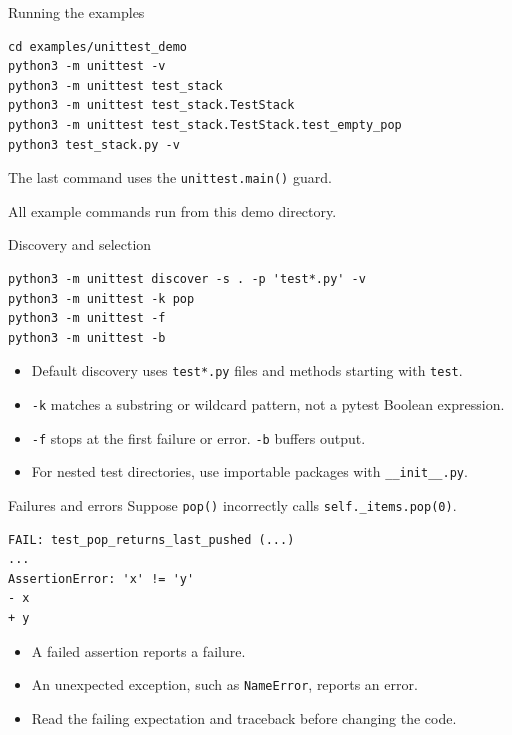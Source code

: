 \documentclass[aspectratio=169,11pt]{beamer}
\newcommand{\code}[1]{\texttt{#1}}
\begin{document}
\begin{frame}[fragile]{Running the examples}
\begin{lstlisting}
cd examples/unittest_demo
python3 -m unittest -v
python3 -m unittest test_stack
python3 -m unittest test_stack.TestStack
python3 -m unittest test_stack.TestStack.test_empty_pop
python3 test_stack.py -v
\end{lstlisting}
The last command uses the \code{unittest.main()} guard.

All example commands run from this demo directory.
\end{frame}

\begin{frame}[fragile]{Discovery and selection}
\begin{lstlisting}
python3 -m unittest discover -s . -p 'test*.py' -v
python3 -m unittest -k pop
python3 -m unittest -f
python3 -m unittest -b
\end{lstlisting}
\begin{itemize}
\item Default discovery uses \code{test*.py} files and methods starting with \code{test}.
\item \code{-k} matches a substring or wildcard pattern, not a pytest Boolean expression.
\item \code{-f} stops at the first failure or error. \code{-b} buffers output.
\item For nested test directories, use importable packages with \code{\_\_init\_\_.py}.
\end{itemize}
\end{frame}

\begin{frame}[fragile]{Failures and errors}
Suppose \code{pop()} incorrectly calls \code{self.\_items.pop(0)}.
\begin{lstlisting}
FAIL: test_pop_returns_last_pushed (...)
...
AssertionError: 'x' != 'y'
- x
+ y
\end{lstlisting}
\begin{itemize}
\item A failed assertion reports a failure.
\item An unexpected exception, such as \code{NameError}, reports an error.
\item Read the failing expectation and traceback before changing the code.
\end{itemize}
\end{frame}
\end{document}
